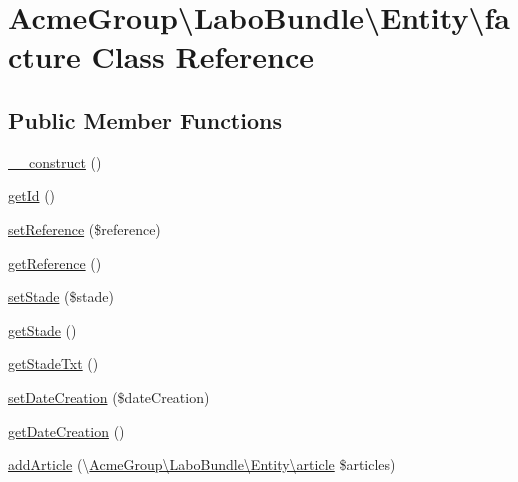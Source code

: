 \hypertarget{class_acme_group_1_1_labo_bundle_1_1_entity_1_1facture}{\section{Acme\+Group\textbackslash{}Labo\+Bundle\textbackslash{}Entity\textbackslash{}facture Class Reference}
\label{class_acme_group_1_1_labo_bundle_1_1_entity_1_1facture}
}
\subsection*{Public Member Functions}
\begin{DoxyCompactItemize}
\item 
\hyperlink{class_acme_group_1_1_labo_bundle_1_1_entity_1_1facture_ae353505980fef975b948592272fea644}{\+\_\+\+\_\+construct} ()
\item 
\hyperlink{class_acme_group_1_1_labo_bundle_1_1_entity_1_1facture_adea5525a5b0a8fdaf515daef7cd8a82d}{get\+Id} ()
\item 
\hyperlink{class_acme_group_1_1_labo_bundle_1_1_entity_1_1facture_affcb7478e08cf0be540584c799e24b73}{set\+Reference} (\$reference)
\item 
\hyperlink{class_acme_group_1_1_labo_bundle_1_1_entity_1_1facture_a03c7bfd0532324d0442eb3b34a5d4671}{get\+Reference} ()
\item 
\hyperlink{class_acme_group_1_1_labo_bundle_1_1_entity_1_1facture_afc58966df1a4929f7b6a8787904f79d1}{set\+Stade} (\$stade)
\item 
\hyperlink{class_acme_group_1_1_labo_bundle_1_1_entity_1_1facture_afd90d72b3126ffaa536c4931fee18142}{get\+Stade} ()
\item 
\hyperlink{class_acme_group_1_1_labo_bundle_1_1_entity_1_1facture_a4d14561cd39d0550bb0efa1e058a023d}{get\+Stade\+Txt} ()
\item 
\hyperlink{class_acme_group_1_1_labo_bundle_1_1_entity_1_1facture_ac61dcf0938c73946e4ac3810ef6dd5ab}{set\+Date\+Creation} (\$date\+Creation)
\item 
\hyperlink{class_acme_group_1_1_labo_bundle_1_1_entity_1_1facture_a7da3478169bba00319763e10b20b3be0}{get\+Date\+Creation} ()
\item 
\hyperlink{class_acme_group_1_1_labo_bundle_1_1_entity_1_1facture_a3bc83b0c5b3375d33db73dbdbd5fe5ed}{add\+Article} (\textbackslash{}\hyperlink{class_acme_group_1_1_labo_bundle_1_1_entity_1_1article}{Acme\+Group\textbackslash{}\+Labo\+Bundle\textbackslash{}\+Entity\textbackslash{}article} \$articles)

\end{DoxyCompactItemize}
